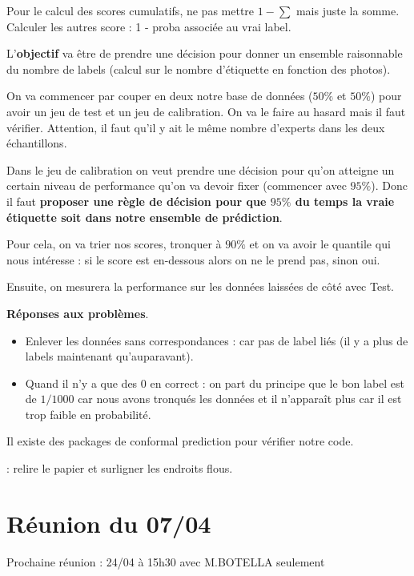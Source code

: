 \documentclass[french]{article}
\begin{document}
Pour le calcul des scores cumulatifs, ne pas mettre $1 - \sum$ mais juste la somme. 
Calculer les autres score : 1 - proba associée au vrai label.

L'\textbf{objectif} va être de prendre une décision pour donner un ensemble raisonnable du nombre de labels (calcul sur le nombre d'étiquette en fonction des photos).

On va commencer par couper en deux notre base de données ($50\%$ et $50\%$) pour avoir un jeu de test et un jeu de calibration. On va le faire au hasard mais il faut vérifier. Attention, il faut qu'il y ait le même nombre d'experts dans les deux échantillons.

Dans le jeu de calibration on veut prendre une décision pour qu'on atteigne un certain niveau de performance qu'on va devoir fixer (commencer avec $95\%$). Donc il faut \textbf{proposer une règle de décision pour que $95\%$ du temps la vraie étiquette soit dans notre ensemble de prédiction}.

Pour cela, on va trier nos scores, tronquer à $90\%$ et on va avoir le quantile qui nous intéresse : si le score est en-dessous alors on ne le prend pas, sinon oui.

Ensuite, on mesurera la performance sur les données laissées de côté avec Test.

\textbf{Réponses aux problèmes}.
\begin{itemize}
     \item Enlever les données sans correspondances : car pas de label liés (il y a plus de labels maintenant qu'auparavant).
     \item Quand il n'y a que des $0$ en correct : on part du principe que le bon label est de $1/1000$ car nous avons tronqués les données et il n'apparaît plus car il est trop faible en probabilité.
\end{itemize}

Il existe des packages de conformal prediction pour vérifier notre code.

 : relire le papier et surligner les endroits flous.

\section{Réunion du 07/04}

Prochaine réunion : 24/04 à 15h30 avec M.BOTELLA seulement

\vspace{0.2cm}
\end{document}
